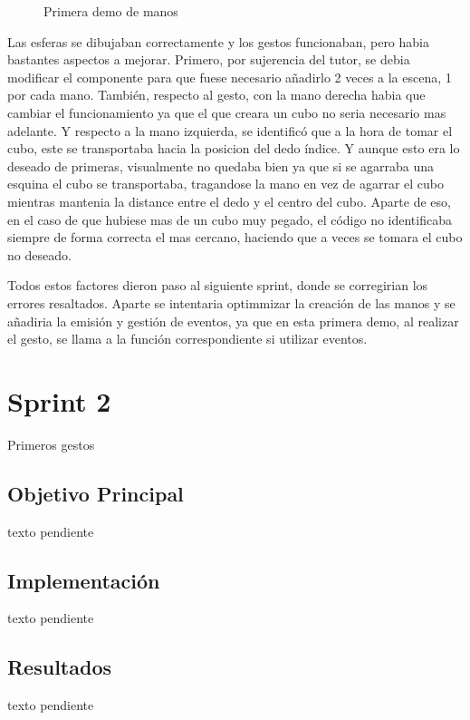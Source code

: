 \documentclass[a4paper, 12pt]{book}
\begin{document}
\begin{figure}[H] 
  \centering
  \fbox{\rule{0pt}{150pt} \rule{0.7\textwidth}{0pt}} 
  \caption{Primera demo de manos}
  \label{fig:sprint1}
\end{figure}

Las esferas se dibujaban correctamente y los gestos funcionaban, pero habia bastantes aspectos a mejorar. Primero, por sujerencia del tutor,
se debia modificar el componente para que fuese necesario añadirlo 2 veces a la escena, 1 por cada mano. También, respecto al gesto, con la mano derecha habia que cambiar el funcionamiento
ya que el que creara un cubo no seria necesario mas adelante. Y respecto a la mano izquierda, se identificó que a la hora de tomar el cubo, este se transportaba hacia la posicion del dedo índice. 
Y aunque esto era lo deseado de primeras, visualmente no quedaba bien ya que si se agarraba una esquina el cubo se transportaba, tragandose la mano en vez de agarrar el cubo mientras mantenia la distance entre el dedo y el centro del cubo. 
Aparte de eso, en el caso de que hubiese mas de un cubo muy pegado, el código no identificaba siempre de forma correcta el mas cercano, haciendo que a veces se tomara el cubo no deseado.

Todos estos factores dieron paso al siguiente sprint, donde se corregirian los errores resaltados. Aparte se intentaria optimmizar la creación de las manos y se añadiria la emisión y gestión de eventos, ya que en esta primera demo, al realizar el gesto, se llama a la función correspondiente si utilizar eventos. 

\section{Sprint 2}
\label{sec:sprint2}
Primeros gestos

\subsection{Objetivo Principal}
\label{subsec:objetivo-principal2}
texto pendiente

\subsection{Implementación}
\label{subsec:implementacion2}
texto pendiente

\subsection{Resultados}
\label{subsec:resultados2}
texto pendiente
\end{document}
